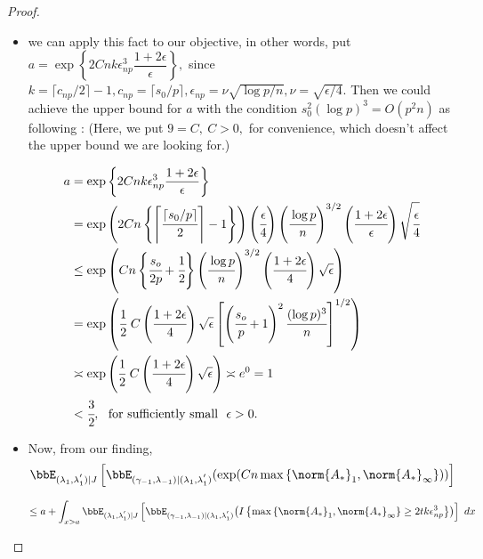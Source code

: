 \begin{proof}
\begin{itemize}
\begin{itemize}
    \vspace{5mm}    
    \item we can apply this fact to our objective, in other words, put 
    $a= \exp\left\{2Cnk{\epsilon^3_{np}}\dfrac{1+2\epsilon}{\epsilon} \right\},$ since $k=\lceil{c_{np}/2}\rceil -1,
    c_{np} = \lceil{s_{0}/p}\rceil, \epsilon_{np} = \nu\sqrt{\log p /n}, \nu = \sqrt{\epsilon / 4}$. Then we could achieve the upper bound for $a$ with the condition $  s_0^2(\log{p})^3 = O(p^2n)$ as following : (Here, we put $9=C,~ C>0,$ for convenience, which doesn't affect the upper bound we are looking for.) 
   
    $$\begin{aligned}
    a
    & = \exp\left\{2Cnk{\epsilon^3_{np}}\dfrac{1+2\epsilon}{\epsilon} \right\}\\
    & = \exp\left(2Cn\left\{ \left\lceil{\cfrac{\lceil{s_{0}/p}\rceil}{2}}\right\rceil -1 \right\}    \right)  \left( \cfrac{\epsilon}{4} \right) \left( \cfrac{\log p}{n}   \right)^{3/2}  \left( \cfrac{1+2\epsilon}{\epsilon} \right) \sqrt{\cfrac{\epsilon}{4}}\\
    & \leq \exp\left( Cn\left\{ \cfrac{s_o}{2p} + \cfrac{1}{2}  \right\}\left( \cfrac{\log p}{n}   \right)^{3/2} \left(\cfrac{1+2\epsilon}{4} \right)\sqrt{\epsilon} \right)\\
    & = \exp \left(\cfrac{1}{2}~C\left(\cfrac{1+2\epsilon}{4} \right)\sqrt{\epsilon} \left[  \left(\cfrac{s_o}{p} +1 \right)^{2} \cfrac{(\log p)^3}{n}  \right]^{1/2} \right)\\
    & \asymp \exp\left(\cfrac{1}{2}~C\left(\cfrac{1+2\epsilon}{4} \right)\sqrt{\epsilon}\right) \asymp e^{0} = 1\\
    & < \cfrac{3}{2}, ~~\text{for sufficiently small}~~ \epsilon > 0.
    \end{aligned}$$

\newpage
    \item Now, from our finding,
    $$\begin{aligned}
    \bbE_{{(\lambda_{1},\lambda_1^{'})}\vert J}\left[\bbE_{(\gamma_{-1},\lambda_{-1}) \vert (\lambda_1,\lambda_1^{'})} {\left(\exp(Cn\max\left\{\norm{A_*}_1,\norm{A_*}_{\infty}\right\})\right)}\right]
    \end{aligned}$$

    $$\begin{aligned}   
    \leq a + \int_{x>a}^{} \bbE_{{(\lambda_{1},\lambda_1^{'})}\vert J}\left[\bbE_{(\gamma_{-1},\lambda_{-1}) \vert (\lambda_1,\lambda_1^{'})} {\left( I \left\{ \max\left\{\norm{A_*}_1,\norm{A_*}_{\infty}\right\} \geq 2tk\epsilon^3_{np} \right\}  \right)}\right]~ dx
    \end{aligned}$$
    

\end{itemize}
\end{itemize}
\end{proof}
